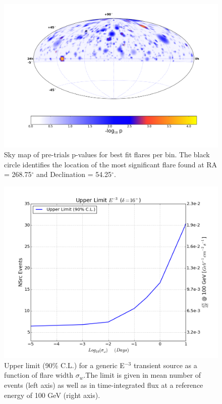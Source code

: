 \documentclass[manuscript]{aastex}
\begin{document}
\begin{figure}[ht]
  \begin{center}
    \includegraphics[width=1.0\textwidth,keepaspectratio]{plots/RealResultSkyMap.png}
  \end{center}
  \caption[Results Sky Map]{Sky map of pre-trials p-values for best fit flares per bin. The black circle identifies the location of the most significant flare found at RA = 268.75$^\circ$ and Declination = 54.25$^\circ$.}
  \label{fig:RealSkyMap}
\end{figure}

\begin{figure}[ht]
  \begin{center}
    \includegraphics[width=1.0\textwidth,keepaspectratio]{plots/LowEnTransient_NEventSensitivity_E3_G1460_Dec16_DoubleY2.png}
  \end{center}
  \caption[Time-integrated Flux Limit for E$^{-3}$ Source]{Upper limit (90$\%$ C.L.) for a generic E$^{-3}$ transient source as a function of flare width $\sigma_w$.The limit is given in mean number of events (left axis) as well as in time-integrated flux at a reference energy of 100 GeV (right axis).}
  \label{fig:GenericE3Limit}
\end{figure}
\end{document}
